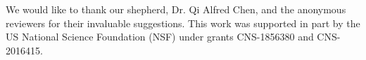 \documentclass[sigconf]{acmart}
\begin{document}
\begin{acks}

We would like to thank 
our shepherd, Dr. Qi Alfred Chen, and 
the anonymous reviewers for their invaluable suggestions. This work was supported in part 
by the US National Science Foundation (NSF) under grants CNS-1856380 and CNS-2016415.
\end{acks}




\begin{comment}
1.051692008972168
0.011272192001342773
0.011022567749023438
0.013002634048461914
0.010323524475097656
0.010485410690307617
0.010286331176757812
0.009960412979125977
0.00958395004272461
0.009414434432983398
0.009481430053710938
0.00946664810180664
\end{comment}
\end{document}
